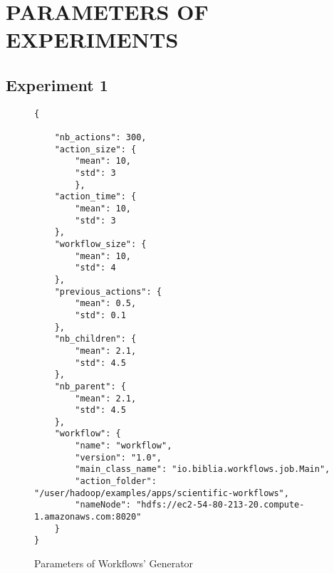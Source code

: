 \chapter{PARAMETERS OF EXPERIMENTS}
\section{Experiment 1}
\label{app:experiment_1_parameters}
\begin{figure}
\begin{singlespace}
\begin{mdframed}
\begin{verbatim}
{

	"nb_actions": 300,
	"action_size": {
		"mean": 10,
		"std": 3
		},
	"action_time": {
		"mean": 10, 
		"std": 3
	},
	"workflow_size": {
		"mean": 10,
		"std": 4
	},
	"previous_actions": {
		"mean": 0.5,
		"std": 0.1
	},
	"nb_children": {
		"mean": 2.1,
		"std": 4.5
	},
	"nb_parent": {
		"mean": 2.1,
		"std": 4.5
	},
	"workflow": {
		"name": "workflow",
		"version": "1.0",
		"main_class_name": "io.biblia.workflows.job.Main",
		"action_folder": "/user/hadoop/examples/apps/scientific-workflows",
		"nameNode": "hdfs://ec2-54-80-213-20.compute-1.amazonaws.com:8020"
	}
}
\end{verbatim}
\end{mdframed}

\caption{Parameters of Workflows' Generator}
\label{fig:parameters_generator_experiment_1}
\end{singlespace}
\end{figure} 